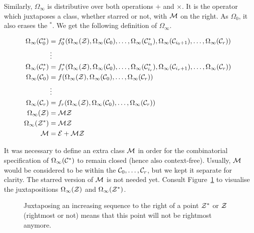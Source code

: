 \documentclass[12pt, a4paper, twoside]{report}
\begin{document}
Similarly, $\Omega_\infty$ is distributive over both operations $+$ and $\times$. It is the operator which juxtaposes a class, whether starred or not, with $\mathcal{M}$ on the right. As $\Omega_0$, it also erases the ${}^*$. We get the following definition of $\Omega_\infty$.

\begin{align*}
  \Omega_\infty(\mathcal{C}_0^*) &= f_0^*(\Omega_\infty(\mathcal{Z}),\Omega_\infty(\mathcal{C}_0),\ldots,\Omega_\infty(\mathcal{C}_{i_0}^*),\Omega_\infty(\mathcal{C}_{i_0+1}),\ldots,\Omega_\infty(\mathcal{C}_r))\\
       &\vdots\\
  \Omega_\infty(\mathcal{C}_r^*) &= f_r^*(\Omega_\infty(\mathcal{Z}),\Omega_\infty(\mathcal{C}_0),\ldots,\Omega_\infty(\mathcal{C}_{i_r}^*),\Omega_\infty(\mathcal{C}_{i_r+1}),\ldots,\Omega_\infty(\mathcal{C}_r))\\
  \Omega_\infty(\mathcal{C}_0) &= f(\Omega_\infty(\mathcal{Z}),\Omega_\infty(\mathcal{C}_0),\ldots,\Omega_\infty(\mathcal{C}_r))\\
       &\vdots\\
  \Omega_\infty(\mathcal{C}_r) &= f_r(\Omega_\infty(\mathcal{Z}),\Omega_\infty(\mathcal{C}_0),\ldots,\Omega_\infty(\mathcal{C}_r))\\
  \Omega_\infty(\mathcal{Z}) &= \mathcal{M}\mathcal{Z}\\
  \Omega_\infty(\mathcal{Z}^*) &= \mathcal{M}\mathcal{Z}\\
  \mathcal{M} &= \mathcal{E} + \mathcal{M}\mathcal{Z}\\
\end{align*}

It was necessary to define an extra class $\mathcal{M}$ in order for the combinatorial specification of $\Omega_\infty(\mathcal{C}^*)$ to remain closed (hence also context-free). Usually, $\mathcal{M}$ would be considered to be within the $\mathcal{C}_0,\ldots,\mathcal{C}_r$, but we kept it separate for clarity. The starred version of $\mathcal{M}$ is not needed yet. Consult Figure~\ref{fig:omega_infty} to visualise the juxtapositions $\Omega_\infty(\mathcal{Z})$ and $\Omega_\infty(\mathcal{Z}^*)$.

\begin{figure}[ht]
    \centering
    \caption{Juxtaposing an increasing sequence to the right of a point $\mathcal{Z}^*$ or $\mathcal{Z}$ (rightmost or not) means that this point will not be rightmost anymore.}
    \label{fig:omega_infty}
\end{figure}
\end{document}
